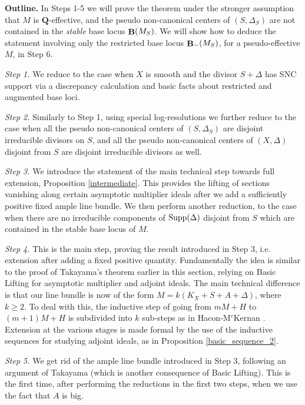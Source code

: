\documentclass[11pt]{amsart}
\theoremstyle{plain}
\theoremstyle{definition}
\newcommand{\QQ}{\mathbf{Q}}
\DeclareMathOperator{\BB}{{\bf B}}
\begin{document}
\noindent
{\bf Outline.}  In Steps 1-5 we will prove the theorem under the stronger assumption that $M$ is $\QQ$-effective, and the pseudo non-canonical centers of $(S, \Delta_S)$ are not contained in the \emph{stable} base locus $\BB(M_S)$. We will show how to deduce the statement involving only the restricted base locus $\BB_{-} (M_S)$, for a pseudo-effective $M$, in Step 6.

\noindent
\emph{Step 1.}
We reduce to the case when $X$ is smooth and the divisor $S + \Delta$ has 
SNC support via a discrepancy  calculation and basic facts about restricted and augmented base loci.

\noindent
\emph{Step 2.}
Similarly to Step 1, using special log-resolutions we further reduce to the case when all the pseudo non-canonical centers of $(S, \Delta_S)$ are disjoint irreducible divisors on $S$, and all the pseudo non-canonical centers of $(X, \Delta)$ disjoint from $S$ are disjoint irreducible divisors as well.

\noindent
\emph{Step 3.}
We introduce the statement of the main technical step towards full extension, Proposition 
\ref{intermediate}. This provides the lifting of sections vanishing along certain asymptotic multiplier ideals 
after we add a sufficiently positive fixed ample line bundle. We then perform another 
reduction, to the case when there are no irreducible components of 
${\rm Supp}(\Delta)$ disjoint from $S$ which are contained in the stable base locus of  $M$.
  
\noindent
\emph{Step 4.}
This is the main step, proving the result introduced in Step 3, i.e. extension after 
adding a fixed positive quantity. Fundamentally the idea is similar to the proof of Takayama's theorem earlier in this section, relying on Basic Lifting for asymptotic multiplier and adjoint ideals. The main technical difference is that our line bundle is now of the form $M = k(K_X + S + A + \Delta)$, 
where $k \ge 2$. To deal with this, the inductive step of going from $mM + H$ to $(m+1) M + H$ is subdivided into $k$ sub-steps as in Hacon-M$^c$Kernan \cite{hm1}. Extension at the various stages is 
made formal by the use of the inductive sequences for studying adjoint ideals, as in 
Proposition \ref{basic_sequence_2}.

\noindent
\emph{Step 5.}
We get rid of the ample line bundle introduced in Step 3, following an argument of Takayama
(which is another consequence of Basic Lifting). This is the first time, after performing the reductions in the first two steps, when we use the fact that $A$ is big.
\end{document}
